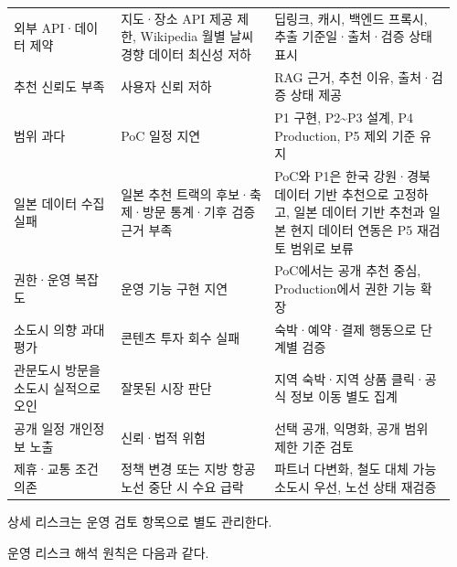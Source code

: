 \documentclass[12pt,a4paper]{article}
\newcommand{\DocNeedspace}[1]{\par\ifdim\dimexpr\pagegoal-\pagetotal\relax<#1\newpage\fi}
\renewcommand{\arraystretch}{1.35}
\begin{document}
\DocNeedspace{24\baselineskip}
\begin{small}
\setlength{\tabcolsep}{3pt}
\setlength{\extrarowheight}{1pt}
\renewcommand{\arraystretch}{1.42}
\begin{longtable}{@{}>{\centering\arraybackslash}m{0.235\linewidth}>{\RaggedRight\arraybackslash}m{0.333\linewidth}>{\RaggedRight\arraybackslash}m{0.391\linewidth}@{}}
\toprule
\multicolumn{1}{>{\centering\arraybackslash}m{0.235\linewidth}}{\textbf{리스크}} & \multicolumn{1}{>{\centering\arraybackslash}m{0.333\linewidth}}{\textbf{영향}} & \multicolumn{1}{>{\centering\arraybackslash}m{0.391\linewidth}}{\textbf{대응}} \\
\midrule
\endhead
외부 API·데이터 제약 & 지도·장소 API 제공 제한, Wikipedia 월별 날씨 경향 데이터 최신성 저하 & 딥링크, 캐시, 백엔드 프록시, 추출 기준일·출처·검증 상태 표시 \\
추천 신뢰도 부족 & 사용자 신뢰 저하 & RAG 근거, 추천 이유, 출처·검증 상태 제공 \\
범위 과다 & PoC 일정 지연 & P1 구현, P2\textasciitilde{}P3 설계, P4 Production, P5 제외 기준 유지 \\
일본 데이터 수집 실패 & 일본 추천 트랙의 후보·축제·방문 통계·기후 검증 근거 부족 & PoC와 P1은 한국 강원·경북 데이터 기반 추천으로 고정하고, 일본 데이터 기반 추천과 일본 현지 데이터 연동은 P5 재검토 범위로 보류 \\
권한·운영 복잡도 & 운영 기능 구현 지연 & PoC에서는 공개 추천 중심, Production에서 권한 기능 확장 \\
소도시 의향 과대평가 & 콘텐츠 투자 회수 실패 & 숙박·예약·결제 행동으로 단계별 검증 \\
관문도시 방문을 소도시 실적으로 오인 & 잘못된 시장 판단 & 지역 숙박·지역 상품 클릭·공식 정보 이동 별도 집계 \\
공개 일정 개인정보 노출 & 신뢰·법적 위험 & 선택 공개, 익명화, 공개 범위 제한 기준 검토 \\
제휴·교통 조건 의존 & 정책 변경 또는 지방 항공 노선 중단 시 수요 급락 & 파트너 다변화, 철도 대체 가능 소도시 우선, 노선 상태 재검증 \\
\bottomrule
\end{longtable}
\end{small}


\DocNeedspace{3\baselineskip}
상세 리스크는 운영 검토 항목으로 별도 관리한다.


\DocNeedspace{3\baselineskip}
운영 리스크 해석 원칙은 다음과 같다.
\end{document}
